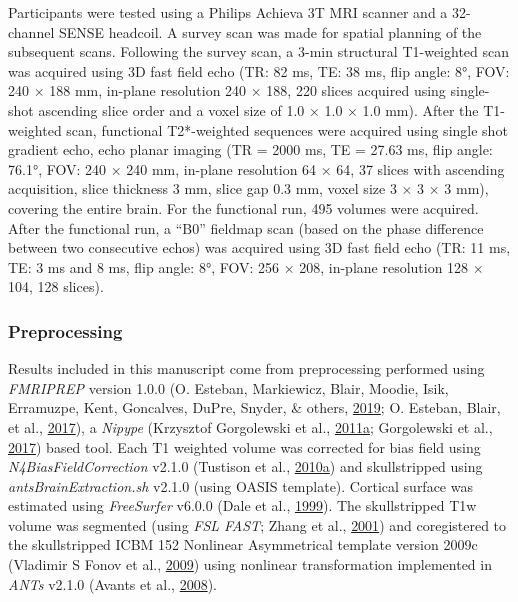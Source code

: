 \documentclass[11pt,american,]{memoir} %
\begin{document}
Participants were tested using a Philips Achieva 3T MRI scanner and a 32-channel SENSE headcoil. A survey scan was made for spatial planning of the subsequent scans. Following the survey scan, a 3-min structural T1-weighted scan was acquired using 3D fast field echo (TR: 82 ms, TE: 38 ms, flip angle: 8°, FOV: 240 × 188 mm, in-plane resolution 240 × 188, 220 slices acquired using single-shot ascending slice order and a voxel size of 1.0 × 1.0 × 1.0 mm). After the T1-weighted scan, functional T2*-weighted sequences were acquired using single shot gradient echo, echo planar imaging (TR = 2000 ms, TE = 27.63 ms, flip angle: 76.1°, FOV: 240 × 240 mm, in-plane resolution 64 × 64, 37 slices with ascending acquisition, slice thickness 3 mm, slice gap 0.3 mm, voxel size 3 × 3 × 3 mm), covering the entire brain. For the functional run, 495 volumes were acquired. After the functional run, a ``B0'' fieldmap scan (based on the phase difference between two consecutive echos) was acquired using 3D fast field echo (TR: 11 ms, TE: 3 ms and 8 ms, flip angle: 8°, FOV: 256 × 208, in-plane resolution 128 × 104, 128 slices).

\hypertarget{morbid-curiosity-methods-imaging-details-preprocessing}{%
\subsubsection{Preprocessing}\label{morbid-curiosity-methods-imaging-details-preprocessing}}

Results included in this manuscript come from preprocessing performed using \emph{FMRIPREP} version 1.0.0 (O. Esteban, Markiewicz, Blair, Moodie, Isik, Erramuzpe, Kent, Goncalves, DuPre, Snyder, \& others, \protect\hyperlink{ref-esteban2019fmriprep}{2019}; O. Esteban, Blair, et al., \protect\hyperlink{ref-esteban_oscar_2017_1095198}{2017}), a \emph{Nipype} (Krzysztof Gorgolewski et al., \protect\hyperlink{ref-gorgolewski2011nipype}{2011}\protect\hyperlink{ref-gorgolewski2011nipype}{a}; Gorgolewski et al., \protect\hyperlink{ref-gorgolewski_krzysztof_j_2017_581704}{2017}) based tool. Each T1 weighted volume was corrected for bias field using \emph{N4BiasFieldCorrection} v2.1.0 (Tustison et al., \protect\hyperlink{ref-tustison2010n4itk}{2010}\protect\hyperlink{ref-tustison2010n4itk}{a}) and skullstripped using \emph{antsBrainExtraction.sh} v2.1.0 (using OASIS template). Cortical surface was estimated using \emph{FreeSurfer} v6.0.0 (Dale et al., \protect\hyperlink{ref-dale1999cortical}{1999}). The skullstripped T1w volume was segmented (using \emph{FSL FAST}; Zhang et al., \protect\hyperlink{ref-zhang2001segmentation}{2001}) and coregistered to the skullstripped ICBM 152 Nonlinear Asymmetrical template version 2009c (Vladimir S Fonov et al., \protect\hyperlink{ref-fonov2009unbiased}{2009}) using nonlinear transformation implemented in \emph{ANTs} v2.1.0 (Avants et al., \protect\hyperlink{ref-avants2008symmetric}{2008}).
\end{document}

